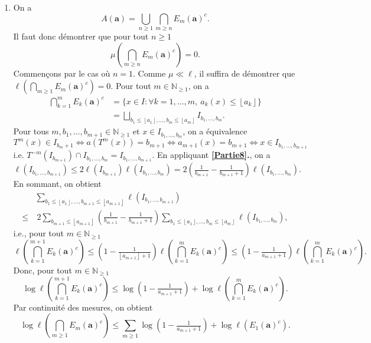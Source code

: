\documentclass[french]{article}
\theoremstyle{definition}
\newcommand{\tuple}[1]{\left(#1\right)}
\newcommand{\floor}[1]{\left\lfloor#1\right\rfloor}
\newcommand{\Nbb}{\mathbb{N}}
\newcommand{\abf}{\mathbf{a}}
\begin{document}
\begin{enumerate}
\begin{enumerate}
            \item \label{Partie13b} On a
                $$A(\abf) = \bigcup_{n \ge 1}\bigcap_{m \ge n}E_m(\abf)^c.$$
            Il faut donc d\'emontrer que pour tout $n \ge 1$
                $$\mu\tuple{\bigcap_{m \ge n} E_m(\abf)^c} = 0.$$
            Commen\c cons par le cas o\`u $n = 1$. Comme $\mu \ll \ell$, il suffira de d\'emontrer que $\ell\tuple{\bigcap_{m \ge 1} E_m(\abf)^c} = 0$. Pour tout $m \in \Nbb_{\ge 1}$, on a
                \begin{align*}
                    \bigcap_{k = 1}^m E_k(\abf)^c & = \{x \in I: \forall k = 1,\ldots,m, \ a_k(x) \le \floor{a_k}\} \\
                    & = \bigsqcup_{b_1 \le \floor{a_1}, \ldots,b_m \le \floor{a_m}} I_{b_1,\ldots,b_m}.
                \end{align*}
            Pour tous $m, b_1,\ldots,b_{m+1} \in \Nbb_{\ge 1}$ et $x \in I_{b_1,\ldots,b_m}$, on a \'equivalence
                $$T^m(x) \in I_{b_m+1} \Leftrightarrow a(T^m(x)) = b_{m+1} \Leftrightarrow a_{m+1}(x) = b_{m+1} \Leftrightarrow x \in I_{b_1,\ldots,b_{m+1}}$$
            i.e. $T^{-m}(I_{b_{m+1}}) \cap I_{b_1,\ldots,b_m} = I_{b_1,\ldots,b_{m+1}}$. En appliquant {\bf \ref{Partie8}.}, on a
                $$\ell(I_{b_1,\ldots,b_{m+1}}) \le 2\ell(I_{b_{m+1}})\ell(I_{b_1,\ldots,b_m}) = 2\tuple{\tfrac{1}{b_{m+1}} - \tfrac{1}{b_{m+1} + 1}}\ell(I_{b_1,\ldots,b_m}).$$
           En sommant, on obtient
                \begin{align*}
                   & \sum_{b_1 \le \floor{a_1},\ldots,b_{m+1}\le \floor{a_{m+1}}} \ell(I_{b_1,\ldots,b_{m+1}})\\
                   \le & \ 2\sum_{b_{m+1}
                   \le \floor{a_{m+1}}} \tuple{\tfrac{1}{b_{m+1}} - \tfrac{1}{b_{m+1} + 1}}\sum_{b_1 \le \floor{a_1},\ldots,b_{m}\le \floor{a_m}}\ell(I_{b_1,\ldots,b_m}),
                \end{align*}
            i.e., pour tout $m \in \Nbb_{\ge 1}$
                $$\ell\tuple{\bigcap_{k = 1}^{m+1} E_k(\abf)^c} \le \tuple{1 - \tfrac{1}{\floor{a_{m+1}} + 1}} \ell\tuple{\bigcap_{k = 1}^m E_k(\abf)^c} \le \tuple{1 - \tfrac{1}{a_{m+1} + 1}} \ell\tuple{\bigcap_{k = 1}^m E_k(\abf)^c}.$$
            Donc, pour tout $m \in \Nbb_{\ge 1}$
                $$\log \ell\tuple{\bigcap_{k = 1}^{m+1} E_k(\abf)^c} \le \log\tuple{1 - \tfrac{1}{a_{m+1} + 1}} + \log \ell\tuple{\bigcap_{k = 1}^m E_k(\abf)^c}.$$
            Par continuit\'e des mesures, on obtient
                $$\log\ell\tuple{\bigcap_{m \ge 1} E_m(\abf)^c} \le \sum_{m \ge 1} \log \tuple{1 - \tfrac{1}{a_{m+1} + 1}} + \log \ell(E_1(\abf)^c).$$

\end{enumerate}
\end{enumerate}
\end{document}
